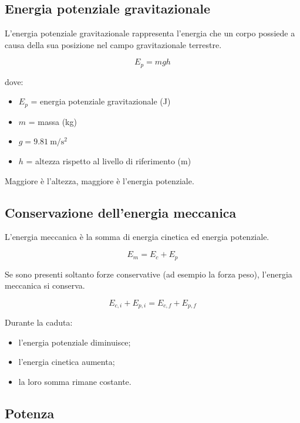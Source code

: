 \vspace{0.3cm}

\subsection{Energia potenziale gravitazionale}

\noindent
L'energia potenziale gravitazionale rappresenta l'energia che un corpo possiede a causa della sua posizione nel campo gravitazionale terrestre.

\[
\boxed{E_p=mgh}
\]

\noindent
dove:

\begin{itemize}
    \item $E_p$ = energia potenziale gravitazionale (J)
    \item $m$ = massa (kg)
    \item $g=9.81\ \mathrm{m/s^2}$
    \item $h$ = altezza rispetto al livello di riferimento (m)
\end{itemize}

\noindent
Maggiore è l'altezza, maggiore è l'energia potenziale.

\vspace{0.3cm}

\subsection{Conservazione dell'energia meccanica}

\noindent
L'energia meccanica è la somma di energia cinetica ed energia potenziale.

\[
\boxed{E_m=E_c+E_p}
\]

\noindent
Se sono presenti soltanto forze conservative (ad esempio la forza peso), l'energia meccanica si conserva.

\[
\boxed{E_{c,i}+E_{p,i}=E_{c,f}+E_{p,f}}
\]

\noindent
Durante la caduta:

\begin{itemize}
    \item l'energia potenziale diminuisce;
    \item l'energia cinetica aumenta;
    \item la loro somma rimane costante.
\end{itemize}

\vspace{0.3cm}

\subsection{Potenza}

